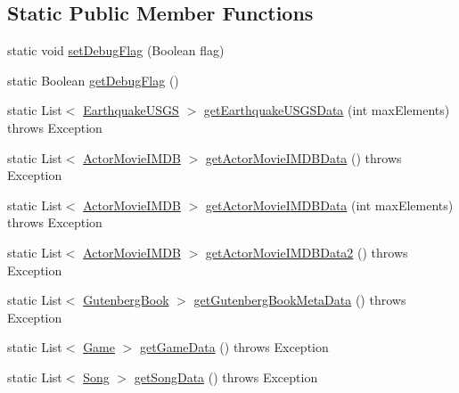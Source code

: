 \subsection*{Static Public Member Functions}
\begin{DoxyCompactItemize}
\item 
static void \mbox{\hyperlink{classbridges_1_1connect_1_1_bridges_a9295b15aa880aa976706ed4f3337fb3b}{set\+Debug\+Flag}} (Boolean flag)
\item 
static Boolean \mbox{\hyperlink{classbridges_1_1connect_1_1_bridges_a5c9fa0dd62084bfd916c8bdecee3f517}{get\+Debug\+Flag}} ()
\item 
static List$<$ \mbox{\hyperlink{classbridges_1_1data__src__dependent_1_1_earthquake_u_s_g_s}{Earthquake\+U\+S\+GS}} $>$ \mbox{\hyperlink{classbridges_1_1connect_1_1_bridges_a58bef23cd12872c6ae5d7358b7485a2b}{get\+Earthquake\+U\+S\+G\+S\+Data}} (int max\+Elements)  throws Exception 
\item 
static List$<$ \mbox{\hyperlink{classbridges_1_1data__src__dependent_1_1_actor_movie_i_m_d_b}{Actor\+Movie\+I\+M\+DB}} $>$ \mbox{\hyperlink{classbridges_1_1connect_1_1_bridges_af35f7a4548f1aec8f208a56e1c74b5aa}{get\+Actor\+Movie\+I\+M\+D\+B\+Data}} ()  throws Exception 
\item 
static List$<$ \mbox{\hyperlink{classbridges_1_1data__src__dependent_1_1_actor_movie_i_m_d_b}{Actor\+Movie\+I\+M\+DB}} $>$ \mbox{\hyperlink{classbridges_1_1connect_1_1_bridges_a76280ef69f0205e3711b18617e5c7646}{get\+Actor\+Movie\+I\+M\+D\+B\+Data}} (int max\+Elements)  throws Exception 
\item 
static List$<$ \mbox{\hyperlink{classbridges_1_1data__src__dependent_1_1_actor_movie_i_m_d_b}{Actor\+Movie\+I\+M\+DB}} $>$ \mbox{\hyperlink{classbridges_1_1connect_1_1_bridges_a7a5f5efc6712ead5babe4cd21a4de3cc}{get\+Actor\+Movie\+I\+M\+D\+B\+Data2}} ()  throws Exception 
\item 
static List$<$ \mbox{\hyperlink{classbridges_1_1data__src__dependent_1_1_gutenberg_book}{Gutenberg\+Book}} $>$ \mbox{\hyperlink{classbridges_1_1connect_1_1_bridges_a7847b5a45cae8491acd5b6fb0015415b}{get\+Gutenberg\+Book\+Meta\+Data}} ()  throws Exception 
\item 
static List$<$ \mbox{\hyperlink{classbridges_1_1data__src__dependent_1_1_game}{Game}} $>$ \mbox{\hyperlink{classbridges_1_1connect_1_1_bridges_a594808b9dada5c825ac00ae0c97c9e9b}{get\+Game\+Data}} ()  throws Exception 
\item 
static List$<$ \mbox{\hyperlink{classbridges_1_1data__src__dependent_1_1_song}{Song}} $>$ \mbox{\hyperlink{classbridges_1_1connect_1_1_bridges_a5bcfed7f065d3c9da31e3551bf31ec7c}{get\+Song\+Data}} ()  throws Exception 

\end{DoxyCompactItemize}
